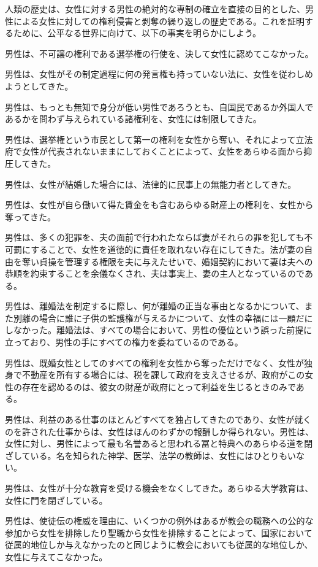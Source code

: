 \documentclass[dvipdfmx,uplatex]{jsarticle}
\begin{document}
人類の歴史は、女性に対する男性の絶対的な専制の確立を直接の目的とした、男性による女性に対しての権利侵害と剥奪の繰り返しの歴史である。これを証明するために、公平なる世界に向けて、以下の事実を明らかにしよう。

男性は、不可譲の権利である選挙権の行使を、決して女性に認めてこなかった。

男性は、女性がその制定過程に何の発言権も持っていない法に、女性を従わしめようとしてきた。

男性は、もっとも無知で身分が低い男性であろうとも、自国民であるか外国人であるかを問わず与えられている諸権利を、女性には制限してきた。

男性は、選挙権という市民として第一の権利を女性から奪い、それによって立法府で女性が代表されないままにしておくことによって、女性をあらゆる面から抑圧してきた。

男性は、女性が結婚した場合には、法律的に民事上の無能力者としてきた。

男性は、女性が自ら働いて得た賃金をも含むあらゆる財産上の権利を、女性から奪ってきた。

男性は、多くの犯罪を、夫の面前で行われたならば妻がそれらの罪を犯しても不可罰にすることで、女性を道徳的に責任を取れない存在にしてきた。法が妻の自由を奪い貞操を管理する権限を夫に与えたせいで、婚姻契約において妻は夫への恭順を約束することを余儀なくされ、夫は事実上、妻の主人となっているのである。

男性は、離婚法を制定するに際し、何が離婚の正当な事由となるかについて、また別離の場合に誰に子供の監護権が与えるかについて、女性の幸福には一顧だにしなかった。離婚法は、すべての場合において、男性の優位という誤った前提に立っており、男性の手にすべての権力を委ねているのである。

男性は、既婚女性としてのすべての権利を女性から奪っただけでなく、女性が独身で不動産を所有する場合には、税を課して政府を支えさせるが、政府がこの女性の存在を認めるのは、彼女の財産が政府にとって利益を生じるときのみである。

男性は、利益のある仕事のほとんどすべてを独占してきたのであり、女性が就くのを許された仕事からは、女性はほんのわずかの報酬しか得られない。男性は、女性に対し、男性によって最も名誉あると思われる冨と特典へのあらゆる道を閉ざしている。名を知られた神学、医学、法学の教師は、女性にはひとりもいない。

男性は、女性が十分な教育を受ける機会をなくしてきた。あらゆる大学教育は、女性に門を閉ざしている。

男性は、使徒伝の権威を理由に、いくつかの例外はあるが教会の職務への公的な参加から女性を排除したり聖職から女性を排除することによって、国家において従属的地位しか与えなかったのと同じように教会においても従属的な地位しか、女性に与えてこなかった。
\end{document}

